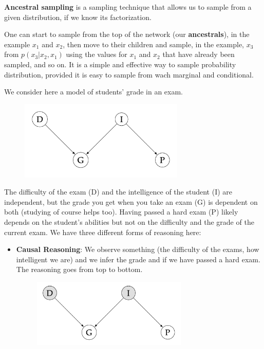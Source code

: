 \textbf{Ancestral sampling} is a sampling technique that allows us to sample from a given distribution, if we know its factorization.

One can start to sample from the top of the network (our \textbf{ancestrals}), in the example $x_1$ and $x_2$, then move to their children and sample, in the example, $x_3$ from $p(x_3|x_2,x_1)$ using the values for $x_1$ and $x_2$ that have already been sampled, and so on. It is a simple and effective way to sample probability distribution, provided it is easy to sample from wach marginal and conditional.

\begin{exampleblock}
    We consider here a model of students' grade in an exam.
    \begin{figure}[H]
        \centering
        \includegraphics[width=0.7\textwidth]{assets/fig4.png}
    \end{figure}
    The diﬃculty of the exam (D) and the intelligence of the student (I)
    are independent, but the grade you get when you take an exam (G) is
    dependent on both (studying of course helps too). Having passed a hard
    exam (P) likely depends on the student’s abilities but not on the diﬃculty
    and the grade of the current exam. We have three diﬀerent forms of
    reasoning here:
    \begin{itemize}
        \item \textbf{Causal Reasoning}: We observe something (the diﬃculty of the exams, how intelligent
        we are) and we infer the grade and if we have passed a hard exam.
        The reasoning goes from top to bottom.
        \begin{figure}[H]
            \centering
            \includegraphics[width=0.7\textwidth]{assets/fig5.png}

\end{figure}
\end{itemize}
\end{exampleblock}

